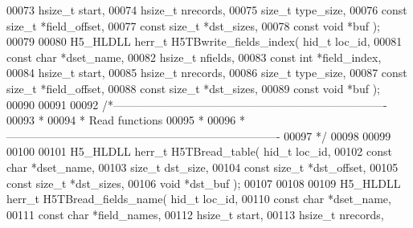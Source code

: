\begin{DoxyCode}
00073                               hsize\_t start,
00074                               hsize\_t nrecords,
00075                               \textcolor{keywordtype}{size\_t} type\_size,
00076                               \textcolor{keyword}{const} \textcolor{keywordtype}{size\_t} *field\_offset,
00077                               \textcolor{keyword}{const} \textcolor{keywordtype}{size\_t} *dst\_sizes,
00078                               \textcolor{keyword}{const} \textcolor{keywordtype}{void} *buf );
00079 
00080 H5\_HLDLL herr\_t  H5TBwrite\_fields\_index( hid\_t loc\_id,
00081                                \textcolor{keyword}{const} \textcolor{keywordtype}{char} *dset\_name,
00082                                hsize\_t nfields,
00083                                \textcolor{keyword}{const} \textcolor{keywordtype}{int} *field\_index,
00084                                hsize\_t start,
00085                                hsize\_t nrecords,
00086                                \textcolor{keywordtype}{size\_t} type\_size,
00087                                \textcolor{keyword}{const} \textcolor{keywordtype}{size\_t} *field\_offset,
00088                                \textcolor{keyword}{const} \textcolor{keywordtype}{size\_t} *dst\_sizes,
00089                                \textcolor{keyword}{const} \textcolor{keywordtype}{void} *buf );
00090 
00091 
00092 \textcolor{comment}{/*-------------------------------------------------------------------------}
00093 \textcolor{comment}{ *}
00094 \textcolor{comment}{ * Read functions}
00095 \textcolor{comment}{ *}
00096 \textcolor{comment}{ *-------------------------------------------------------------------------}
00097 \textcolor{comment}{ */}
00098 
00099 
00100 
00101 H5\_HLDLL herr\_t  H5TBread\_table( hid\_t loc\_id,
00102                        \textcolor{keyword}{const} \textcolor{keywordtype}{char} *dset\_name,
00103                        \textcolor{keywordtype}{size\_t} dst\_size,
00104                        \textcolor{keyword}{const} \textcolor{keywordtype}{size\_t} *dst\_offset,
00105                        \textcolor{keyword}{const} \textcolor{keywordtype}{size\_t} *dst\_sizes,
00106                        \textcolor{keywordtype}{void} *dst\_buf );
00107 
00108 
00109 H5\_HLDLL herr\_t  H5TBread\_fields\_name( hid\_t loc\_id,
00110                              \textcolor{keyword}{const} \textcolor{keywordtype}{char} *dset\_name,
00111                              \textcolor{keyword}{const} \textcolor{keywordtype}{char} *field\_names,
00112                              hsize\_t start,
00113                              hsize\_t nrecords,

\end{DoxyCode}
